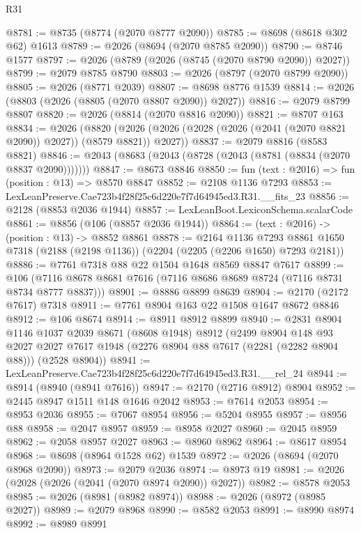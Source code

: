 \begin{lexlean}{R31}
\begin{coremodule}
@8781 := @8735 (@8774 (@2070 @8777 @2090))
@8785 := @8698 (@8618 @302 @62) @1613
@8789 := @2026 (@8694 (@2070 @8785 @2090))
@8790 := @8746 @1577
@8797 := @2026 (@8789 (@2026 (@8745 (@2070 @8790 @2090)) @2027))
@8799 := @2079 @8785 @8790
@8803 := @2026 (@8797 (@2070 @8799 @2090))
@8805 := @2026 (@8771 @2039)
@8807 := @8698 @8776 @1539
@8814 := @2026 (@8803 (@2026 (@8805 (@2070 @8807 @2090)) @2027))
@8816 := @2079 @8799 @8807
@8820 := @2026 (@8814 (@2070 @8816 @2090))
@8821 := @8707 @163
@8834 := @2026
    (@8820 (@2026 (@2026 (@2028 (@2026 (@2041 (@2070 @8821 @2090)) @2027)) (@8579 @8821)) @2027))
@8837 := @2079 @8816 (@8583 @8821)
@8846 := @2043 (@8683 (@2043 (@8728 (@2043 (@8781 (@8834 (@2070 @8837 @2090)))))))
@8847 := @8673 @8846
@8850 := fun (text : @2016) => fun (position : @13) => @8570 @8847
@8852 := @2108 @1136 @7293
@8853 := LexLeanPreserve.Cae723b4f28f25c6d220e7f7d64945ed3.R31.__fits_23
@8856 := @2128 (@8853 @2036 @1944)
@8857 := LexLeanBoot.LexiconSchema.scalarCode
@8861 := @8856 (@106 (@8857 @2036 @1944))
@8864 := (text : @2016) -> (position : @13) -> @8852 @8861
@8878 := @2164
    @1136
    @7293
    @8861
    @1650
    @7318
    (@2188 (@2198 @1136))
    (@2204 (@2205 (@2206 @1650) @7293 @2181))
@8886 := @7761 @7318 @88 @22 @1504 @1648 @8569 @8847 @7617
@8899 := @106 (@7116 @8678 @8681 @7616 (@7116 @8686 @8689 @8724 (@7116 @8731 @8734 @8777 @8837)))
@8901 := @8886 @8899 @8639
@8904 := @2170 (@2172 @7617) @7318
@8911 := @7761 @8904 @163 @22 @1508 @1647 @8672 @8846
@8912 := @106 @8674
@8914 := @8911 @8912 @8899
@8940 := @2831
    @8904
    @1146
    @1037
    @2039
    @8671
    (@8608 @1948)
    @8912
    (@2499
      @8904
      @148
      @93
      @2027
      @2027
      @7617
      @1948
      (@2276 @8904 @88 @7617 (@2281 (@2282 @8904 @88)))
      (@2528 @8904))
@8941 := LexLeanPreserve.Cae723b4f28f25c6d220e7f7d64945ed3.R31.__rel_24
@8944 := @8914 (@8940 (@8941 @7616))
@8947 := @2170 (@2716 @8912) @8904
@8952 := @2445 @8947 @1511 @148 @1646 @2042
@8953 := @7614 @2053
@8954 := @8953 @2036
@8955 := @7067 @8954
@8956 := @5204 @8955
@8957 := @8956 @88
@8958 := @2047 @8957
@8959 := @8958 @2027
@8960 := @2045 @8959
@8962 := @2058 @8957 @2027
@8963 := @8960 @8962
@8964 := @8617 @8954
@8968 := @8698 (@8964 @1528 @62) @1539
@8972 := @2026 (@8694 (@2070 @8968 @2090))
@8973 := @2079 @2036
@8974 := @8973 @19
@8981 := @2026 (@2028 (@2026 (@2041 (@2070 @8974 @2090)) @2027))
@8982 := @8578 @2053
@8985 := @2026 (@8981 (@8982 @8974))
@8988 := @2026 (@8972 (@8985 @2027))
@8989 := @2079 @8968
@8990 := @8582 @2053
@8991 := @8990 @8974
@8992 := @8989 @8991

\end{coremodule}
\end{lexlean}
